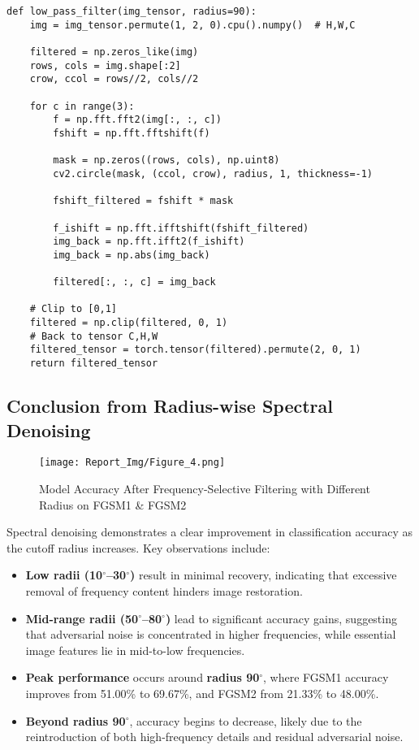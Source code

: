 \documentclass[a4paper,12pt]{report}
\begin{document}
\begin{verbatim}
def low_pass_filter(img_tensor, radius=90):
    img = img_tensor.permute(1, 2, 0).cpu().numpy()  # H,W,C

    filtered = np.zeros_like(img)
    rows, cols = img.shape[:2]
    crow, ccol = rows//2, cols//2

    for c in range(3):
        f = np.fft.fft2(img[:, :, c])
        fshift = np.fft.fftshift(f)

        mask = np.zeros((rows, cols), np.uint8)
        cv2.circle(mask, (ccol, crow), radius, 1, thickness=-1)

        fshift_filtered = fshift * mask

        f_ishift = np.fft.ifftshift(fshift_filtered)
        img_back = np.fft.ifft2(f_ishift)
        img_back = np.abs(img_back)

        filtered[:, :, c] = img_back

    # Clip to [0,1]
    filtered = np.clip(filtered, 0, 1)
    # Back to tensor C,H,W
    filtered_tensor = torch.tensor(filtered).permute(2, 0, 1)
    return filtered_tensor
\end{verbatim}

\subsection{Conclusion from Radius-wise Spectral Denoising}
\begin{figure}[H]
\centering
\texttt{[image: Report\_Img/Figure\_4.png]}
\caption{Model Accuracy After Frequency-Selective Filtering with Different Radius on FGSM1 \& FGSM2}
\end{figure}

Spectral denoising demonstrates a clear improvement in classification accuracy as the cutoff radius increases. Key observations include:

\begin{itemize}
    \item \textbf{Low radii (10$^{\circ}$--30$^{\circ}$)} result in minimal recovery, indicating that excessive removal of frequency content hinders image restoration.
    
    \item \textbf{Mid-range radii (50$^{\circ}$--80$^{\circ}$)} lead to significant accuracy gains, suggesting that adversarial noise is concentrated in higher frequencies, while essential image features lie in mid-to-low frequencies.
    
    \item \textbf{Peak performance} occurs around \textbf{radius 90$^{\circ}$}, where FGSM1 accuracy improves from 51.00\% to 69.67\%, and FGSM2 from 21.33\% to 48.00\%.
    
    \item \textbf{Beyond radius 90$^{\circ}$}, accuracy begins to decrease, likely due to the reintroduction of both high-frequency details and residual adversarial noise.
\end{itemize}
\end{document}
